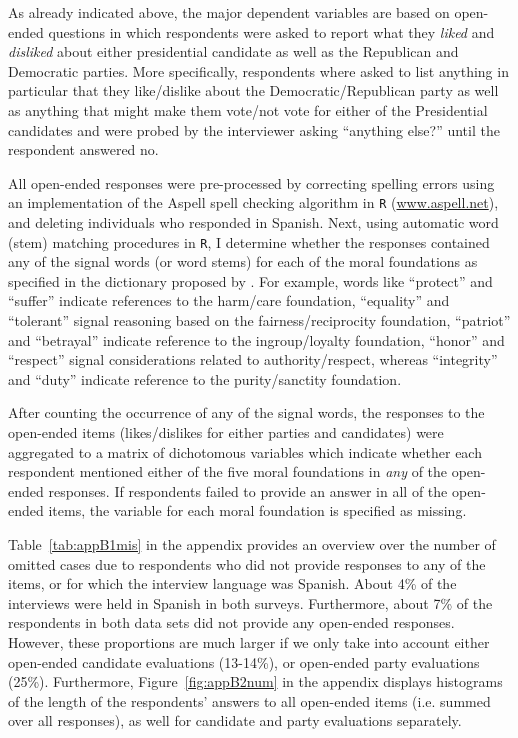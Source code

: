 \documentclass[12pt]{article}
\begin{document}
As already indicated above, the major dependent variables are based on open-ended questions in which respondents were asked to report what they \textit{liked} and \textit{disliked} about either presidential candidate as well as the Republican and Democratic parties. More specifically, respondents where asked to list anything in particular that they like/dislike about the Democratic/Republican party as well as anything that might make them vote/not vote for either of the Presidential candidates and were probed by the interviewer asking ``anything else?'' until the respondent answered no.

All open-ended responses were pre-processed by correcting spelling errors using an implementation of the Aspell spell checking algorithm in \texttt{R} (\url{www.aspell.net}), and deleting individuals who responded in Spanish. Next, using automatic word (stem) matching procedures in \texttt{R}, I determine whether the responses contained any of the signal words (or word stems) for each of the moral foundations as specified in the dictionary proposed by \citet[][the word lists are also presented in Appendix~\ref{app:oview}]{graham2009liberals}. For example, words like ``protect'' and ``suffer'' indicate references to the harm/care foundation, ``equality'' and ``tolerant'' signal reasoning based on the fairness/reciprocity foundation, ``patriot'' and ``betrayal'' indicate reference to the ingroup/loyalty foundation, ``honor'' and ``respect'' signal considerations related to authority/respect, whereas ``integrity'' and ``duty'' indicate reference to the purity/sanctity foundation.

After counting the occurrence of any of the signal words, the responses to the open-ended items (likes/dislikes for either parties and candidates) were aggregated to a matrix of dichotomous variables which indicate whether each respondent mentioned either of the five moral foundations in \textit{any} of the open-ended responses. If respondents failed to provide an answer in all of the open-ended items, the variable for each moral foundation is specified as missing.

Table~\ref{tab:appB1mis} in the appendix provides an overview over the number of omitted cases due to respondents who did not provide responses to any of the items, or for which the interview language was Spanish. About 4\% of the interviews were held in Spanish in both surveys. Furthermore, about 7\% of the respondents in both data sets did not provide any open-ended responses. However, these proportions are much larger if we only take into account either open-ended candidate evaluations (13-14\%), or open-ended party evaluations (25\%). Furthermore, Figure~\ref{fig:appB2num} in the appendix displays histograms of the length of the respondents' answers to all open-ended items (i.e. summed over all responses), as well for candidate and party evaluations separately.
\end{document}
